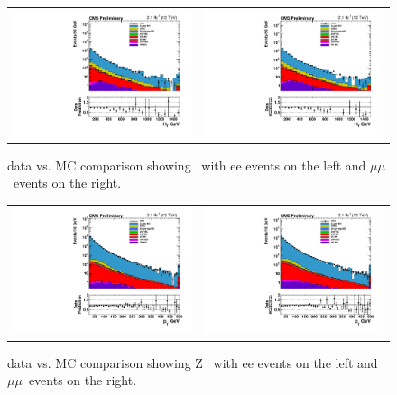 \begin{figure}[!ht]
  \begin{center}
    \begin{tabular}{cc}
      \includegraphics[width=0.4\linewidth]{evtsel/figs/h_ht_highbin_ee_signalregion_inclusive_passtrig.pdf} &
      \includegraphics[width=0.4\linewidth]{evtsel/figs/h_ht_highbin_mm_signalregion_inclusive_passtrig.pdf} \\
    \end{tabular}
    \caption{
      \label{fig:datavsmc_ht}
      data vs. MC comparison showing \HT\ with ee events on the left and $\mu\mu$~events on the right.
    }
  \end{center}
\end{figure}

\begin{figure}[!ht]
  \begin{center}
    \begin{tabular}{cc}
      \includegraphics[width=0.4\linewidth]{evtsel/figs/h_ptdil_ee_signalregion_inclusive_passtrig.pdf} &
      \includegraphics[width=0.4\linewidth]{evtsel/figs/h_ptdil_mm_signalregion_inclusive_passtrig.pdf} \\
    \end{tabular}
    \caption{
      \label{fig:datavsmc_ptdil}
      data vs. MC comparison showing Z \pt\ with ee events on the left and $\mu\mu$~events on the right.
    }
  \end{center}
\end{figure}

